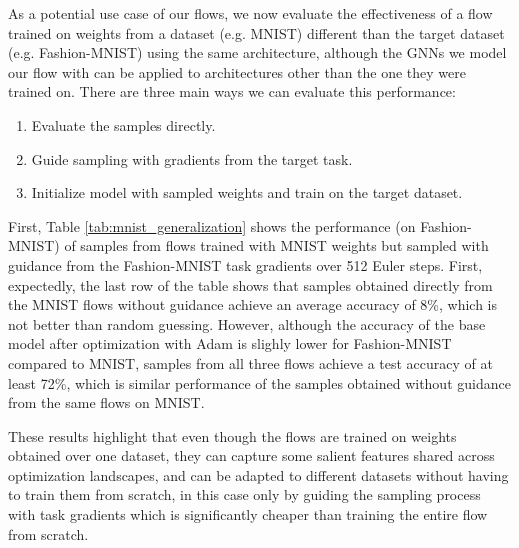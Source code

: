 As a potential use case of our flows, we now evaluate the effectiveness of a flow trained on weights from a dataset (e.g. MNIST) different than the target dataset (e.g. Fashion-MNIST) using the same architecture, although the GNNs we model our flow with can be applied to architectures other than the one they were trained on. There are three main ways we can evaluate this performance:
\begin{enumerate}
    \item Evaluate the samples directly.
    \item Guide sampling with gradients from the target task. 
    \item Initialize model with sampled weights and train on the target dataset.
\end{enumerate}

First, Table \ref{tab:mnist_generalization} shows the performance (on Fashion-MNIST) of samples from flows trained with MNIST weights but sampled with guidance from the Fashion-MNIST task gradients over 512 Euler steps. First, expectedly, the last row of the table shows that samples obtained directly from the MNIST flows without guidance achieve an average accuracy of 8\%, which is not better than random guessing. However, although the accuracy of the base model after optimization with Adam is slighly lower for Fashion-MNIST compared to MNIST, samples from all three flows achieve a test accuracy of at least 72\%, which is similar performance of the samples obtained without guidance from the same flows on MNIST. 

These results highlight that even though the flows are trained on weights obtained over one dataset, they can capture some salient features shared across optimization landscapes, and can be adapted to different datasets without having to train them from scratch, in this case only by guiding the sampling process with task gradients which is significantly cheaper than training the entire flow from scratch.  

